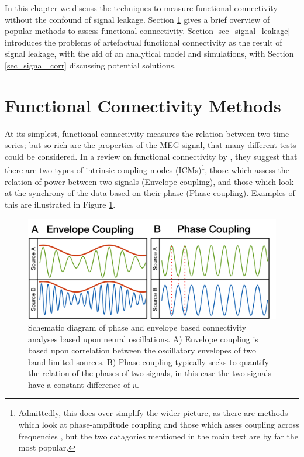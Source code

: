 In this chapter we discuss the techniques to measure functional connectivity without the confound of signal leakage.  Section \ref{sec_fc_1} gives a brief overview of popular methods to assess functional connectivity. Section \ref{sec_signal_leakage} introduces the problems of artefactual functional connectivity as the result of signal leakage, with the aid of an analytical model and simulations, with Section \ref{sec_signal_corr} discussing potential solutions.

\section{Functional Connectivity Methods}\label{sec_fc_1}

At its simplest, functional connectivity measures the relation between two time series; but so rich are the properties of the MEG signal, that many different tests could be considered. In a review on functional connectivity by \cite{Engel2013}, they suggest that there are two types of intrinsic coupling modes (ICMs)\footnote{Admittedly, this does over simplify the wider picture, as there are methods which look at phase-amplitude coupling \citep{Canolty2006,Florin2015} and those which asses coupling across frequencies \citep{Canolty2010,vanWijk2014}, but the two catagories mentioned in the main text are by far the most popular.}, those which assess the relation of power between two signals (Envelope coupling), and those which look at the synchrony of the data based on their phase (Phase coupling). Examples of this are illustrated in Figure \ref{figure_3_a}. 

\begin{figure}[h!]
	\begin{center}
		\includegraphics[width=0.9\linewidth]{./images/chapter3/fig_conn_1.png}\caption{Schematic diagram of phase and envelope based connectivity analyses based upon neural oscillations. A) Envelope coupling is based upon correlation between the oscillatory envelopes of two band limited sources. B) Phase coupling typically seeks to quantify the relation of the phases of two signals, in this case the two signals have a constant difference of π.}\label{figure_3_a}
	\end{center}
\end{figure}


